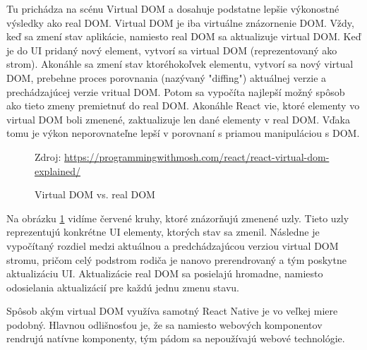 Tu prichádza na scénu Virtual DOM a dosahuje podstatne lepšie výkonostné výsledky ako real DOM. Virtual DOM je iba virtuálne znázornenie DOM. Vždy, keď sa zmení stav aplikácie, namiesto real DOM sa aktualizuje virtual DOM. Keď je do UI pridaný nový element, vytvorí sa virtual DOM (reprezentovaný ako strom). Akonáhle sa zmení stav ktoréhokoľvek elementu, vytvorí sa nový virtual DOM, prebehne proces porovnania (nazývaný "diffing") aktuálnej verzie a prechádzajúcej verzie vritual DOM. Potom sa vypočíta najlepší možný spôsob ako tieto zmeny premietnuť do real DOM. Akonáhle React vie, ktoré elementy vo virtual DOM boli zmenené, zaktualizuje len dané elementy v real DOM. Vďaka tomu je výkon neporovnateľne lepší v porovnaní s priamou manipuláciou s DOM.

\begin{figure}[!htbp]
  \centering  
  \def\stackalignment{c}
           {\scriptsize%
            Zdroj: \url{https://programmingwithmosh.com/react/react-virtual-dom-explained/}}
	\caption{Virtual DOM vs. real DOM}  
  \label{domImg}
\end{figure}
Na obrázku \ref{domImg} vidíme červené kruhy, ktoré znázorňujú zmenené uzly. Tieto uzly reprezentujú konkrétne UI elementy, ktorých stav sa zmenil. Následne je vypočítaný rozdiel medzi aktuálnou a predchádzajúcou verziou virtual DOM stromu, pričom celý podstrom rodiča je nanovo prerendrovaný a tým poskytne aktualizáciu UI. Aktualizácie real DOM sa posielajú hromadne, namiesto odosielania aktualizácií pre každú jednu zmenu stavu.

Spôsob akým virtual DOM využíva samotný React Native je vo veľkej miere podobný. Hlavnou odlišnosťou je, že sa namiesto webových komponentov rendrujú natívne komponenty, tým pádom sa nepoužívajú webové technológie. \\

